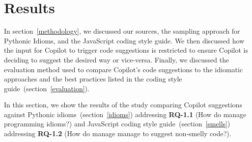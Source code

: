 \section{Results}
\label{results}

In section~\ref{methodology}, we discussed our sources, the sampling approach for Pythonic Idioms, and the JavaScript coding style guide. 
We then discussed how the input for Copilot to trigger code suggestions is restricted to ensure Copilot is deciding to suggest the desired way or vice-versa.
Finally, we discussed the evaluation method used to compare Copilot's code suggestions to the idiomatic approaches and the best practices listed in the coding style guide~(section~\ref{evaluation}).

In this section, we show the results of the study comparing Copilot suggestions against Pythonic idioms~(section~\ref{idioms}) addressing \textbf{RQ-1.1} (How do \cct{} manage programming idioms?) and JavaScript coding style guide~(section~\ref{smells}) addressing \textbf{RQ-1.2} (How do \cct{} manage manage to suggest non-smelly code?).




